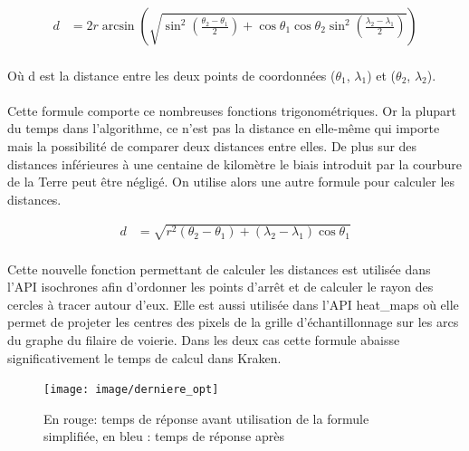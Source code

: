 \documentclass[a4paper]{report}
\begin{document}
\begin{align}
	d &= 2r\arcsin\left(\sqrt{\sin^2\left(\frac{\theta_{2} - \theta_{1}}{2}\right)+\cos\theta_{1}\cos\theta_{2}\sin^2\left(\frac{\lambda_{2} - \lambda_{1}}{2}\right)}\right)
\end{align}

\paragraph{} Où d est la distance entre les deux points de coordonnées ($\theta_{1}$, $\lambda_{1}$) et ($\theta_{2}$, $\lambda_{2}$).

\paragraph{} Cette formule comporte ce nombreuses fonctions trigonométriques. Or la plupart du temps dans l'algorithme, ce n'est pas la distance en elle-même qui importe mais la possibilité de comparer deux distances entre elles. De plus sur des distances inférieures à une centaine de kilomètre le biais introduit par la courbure de la Terre peut être négligé. On utilise alors une autre formule pour calculer les distances.

\begin{align}
	d &= \sqrt{r^2\left(\theta_{2} - \theta_{1}\right)+\left(\lambda_{2} - \lambda_{1}\right)\cos\theta_{1}}
\end{align}

\paragraph{} Cette nouvelle fonction permettant de calculer les distances est utilisée dans l'API isochrones afin d'ordonner les points d'arrêt et de calculer le rayon des cercles à tracer autour d'eux. Elle est aussi utilisée dans l'API heat\_maps où elle permet de projeter les centres des pixels de la grille d'échantillonnage sur les arcs du graphe du filaire de voierie. Dans les deux cas cette formule abaisse significativement le temps de calcul dans Kraken. 

\begin{figure}[H]
	\begin{center}
		\texttt{[image: image/derniere\_opt]}
		\caption{En rouge: temps de réponse avant utilisation de la formule simplifiée, en bleu : temps de réponse après}
		\label{Temps de réponse après utilisation de la formule simplifiée}
	\end{center}
\end{figure}
\end{document}

